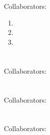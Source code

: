 \documentclass{article}[11pt]
\begin{document}
\section{}
Collaborators: 
\begin{enumerate}[label=(\alph*)]
  \item 
  \item 
  \item 
\end{enumerate}


\newpage
\section{}
Collaborators: 



\newpage
\section{}
Collaborators: 



\newpage
\section{}
Collaborators: 
\end{document}
